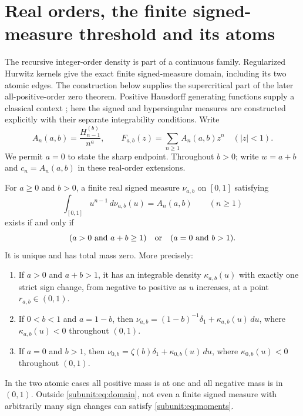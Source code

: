 \section{Real orders, the finite signed-measure threshold and its atoms}
\label{subunit:sec:main}
\newcommand{\realcut}{\C\setminus[1,\infty)}

The recursive integer-order density is part of a continuous family.
Regularized Hurwitz kernels give the exact finite signed-measure domain,
including its two atomic edges. The construction below supplies the
supercritical part of the later all-positive-order zero theorem.
Positive Hausdorff generating functions supply a classical context
\cite{rw:LiuPego}; here the signed and hypersingular measures are
constructed explicitly with their separate integrability conditions.
Write
\[
 A_n(a,b)=\frac{H_{n-1}^{(b)}}{n^a},\qquad
 F_{a,b}(z)=\sum_{n\geq1}A_n(a,b)z^n\quad(|z|<1).
\]
We permit $a=0$ to state the sharp endpoint. Throughout $b>0$;
write $w=a+b$ and $c_n=A_n(a,b)$ in these real-order extensions.

\begin{theorem}
\label{subunit:thm:domain}
For $a\geq0$ and $b>0$, a finite real signed measure $\nu_{a,b}$ on
$[0,1]$ satisfying
\begin{equation}\label{subunit:eq:moments}
 \int_{[0,1]}u^{n-1}\,d\nu_{a,b}(u)=A_n(a,b)
 \qquad(n\geq1)
\end{equation}
exists if and only if
\begin{equation}\label{subunit:eq:domain}
 (a>0\ \hbox{and}\ a+b\geq1)
 \quad\hbox{or}\quad(a=0\ \hbox{and}\ b>1).
\end{equation}
It is unique and has total mass zero. More precisely:
\begin{enumerate}
\item If $a>0$ and $a+b>1$, it has an integrable density
      $\kappa_{a,b}(u)$ with exactly one strict sign change, from
      negative to positive as $u$ increases, at a point $r_{a,b}\in(0,1)$.
\item If $0<b<1$ and $a=1-b$, then
      $\nu_{a,b}=(1-b)^{-1}\delta_1+\kappa_{a,b}(u)\,du$,
      where $\kappa_{a,b}(u)<0$ throughout $(0,1)$.
\item If $a=0$ and $b>1$, then
      $\nu_{0,b}=\zeta(b)\delta_1+\kappa_{0,b}(u)\,du$,
      where $\kappa_{0,b}(u)<0$ throughout $(0,1)$.
\end{enumerate}
In the two atomic cases all positive mass is at one and all negative
mass is in $(0,1)$. Outside \eqref{subunit:eq:domain}, not even a
finite signed measure with arbitrarily many sign changes can satisfy
\eqref{subunit:eq:moments}.
\end{theorem}

